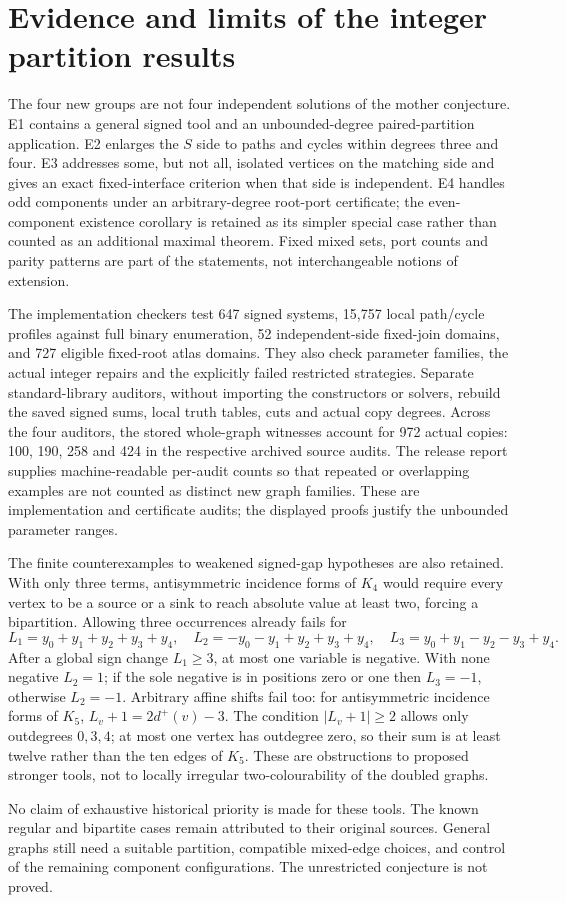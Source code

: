 \section{Evidence and limits of the integer partition results}\label{sec:partitionevidence}

The four new groups are not four independent solutions of the mother
conjecture. E1 contains a general signed tool and an unbounded-degree
paired-partition application. E2 enlarges the $S$ side to paths and
cycles within degrees three and four. E3 addresses some, but not all,
isolated vertices on the matching side and gives an exact fixed-interface
criterion when that side is independent. E4 handles odd components
under an arbitrary-degree root-port certificate; the even-component
existence corollary is retained as its simpler special case rather than
counted as an additional maximal theorem. Fixed mixed sets, port counts
and parity patterns are part of the statements, not interchangeable
notions of extension.

The implementation checkers test 647 signed systems, 15,757 local
path/cycle profiles against full binary enumeration, 52 independent-side
fixed-join domains, and 727 eligible fixed-root atlas domains. They also
check parameter families, the actual integer repairs and the explicitly
failed restricted strategies. Separate standard-library auditors,
without importing the constructors or solvers, rebuild the saved signed
sums, local truth tables, cuts and actual copy degrees. Across the four
auditors, the stored whole-graph witnesses account for 972 actual
copies: 100, 190, 258 and 424 in the respective archived source audits.
The release report supplies machine-readable per-audit counts
so that repeated or overlapping examples are not counted as distinct
new graph families. These are implementation and certificate audits;
the displayed proofs justify the unbounded parameter ranges.

The finite counterexamples to weakened signed-gap hypotheses are also
retained. With only three terms, antisymmetric incidence forms of $K_4$
would require every vertex to be a source or a sink to reach absolute
value at least two, forcing a bipartition. Allowing three occurrences
already fails for
\[
 L_1=y_0+y_1+y_2+y_3+y_4,\quad
 L_2=-y_0-y_1+y_2+y_3+y_4,\quad
 L_3=y_0+y_1-y_2-y_3+y_4.
\]
After a global sign change $L_1\ge3$, at most one variable is negative.
With none negative $L_2=1$; if the sole negative is in positions zero or
one then $L_3=-1$, otherwise $L_2=-1$. Arbitrary affine shifts fail too:
for antisymmetric incidence forms of $K_5$, $L_v+1=2d^+(v)-3$.
The condition $|L_v+1|\ge2$ allows only outdegrees $0,3,4$; at most one
vertex has outdegree zero, so their sum is at least twelve rather than
the ten edges of $K_5$. These are obstructions to proposed stronger
tools, not to locally irregular two-colourability of the doubled graphs.

No claim of exhaustive historical priority is made for these tools.
The known regular and bipartite cases remain attributed to their
original sources. General graphs still need a suitable partition,
compatible mixed-edge choices, and control of the remaining component
configurations. The unrestricted conjecture is not proved.
